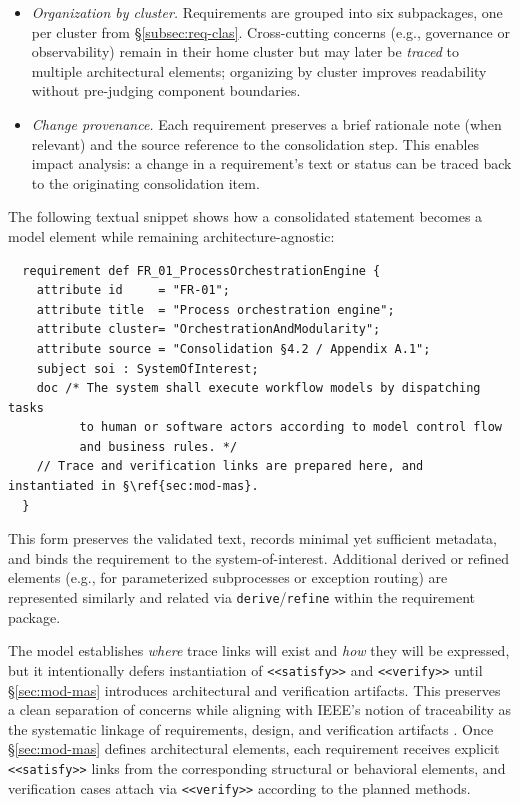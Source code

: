 \begin{itemize}
  \item \emph{Organization by cluster.} Requirements are grouped into six subpackages, one per cluster from §\ref{subsec:req-clas}. Cross-cutting concerns (e.g., governance or observability) remain in their home cluster but may later be \emph{traced} to multiple architectural elements; organizing by cluster improves readability without pre-judging component boundaries.
  \item \emph{Change provenance.} Each requirement preserves a brief rationale note (when relevant) and the source reference to the consolidation step. This enables impact analysis: a change in a requirement's text or status can be traced back to the originating consolidation item.
\end{itemize}

The following textual snippet shows how a consolidated statement becomes a model element while remaining architecture-agnostic:
\begin{footnotesize}
  \begin{verbatim}
  requirement def FR_01_ProcessOrchestrationEngine {
    attribute id     = "FR-01";
    attribute title  = "Process orchestration engine";
    attribute cluster= "OrchestrationAndModularity";
    attribute source = "Consolidation §4.2 / Appendix A.1";
    subject soi : SystemOfInterest;
    doc /* The system shall execute workflow models by dispatching tasks
          to human or software actors according to model control flow
          and business rules. */
    // Trace and verification links are prepared here, and instantiated in §\ref{sec:mod-mas}.
  }
  \end{verbatim}
\end{footnotesize}
This form preserves the validated text, records minimal yet sufficient metadata, and binds the requirement to the system-of-interest. Additional derived or refined elements (e.g., for parameterized subprocesses or exception routing) are represented similarly and related via \texttt{derive}/\texttt{refine} within the requirement package.

The model establishes \emph{where} trace links will exist and \emph{how} they will be expressed, but it intentionally defers instantiation of \texttt{<<satisfy>>} and \texttt{<<verify>>} until §\ref{sec:mod-mas} introduces architectural and verification artifacts. This preserves a clean separation of concerns while aligning with IEEE's notion of traceability as the systematic linkage of requirements, design, and verification artifacts \parencite{IEEEStandard1990}. Once §\ref{sec:mod-mas} defines architectural elements, each requirement receives explicit \texttt{<<satisfy>>} links from the corresponding structural or behavioral elements, and verification cases attach via \texttt{<<verify>>} according to the planned methods.

